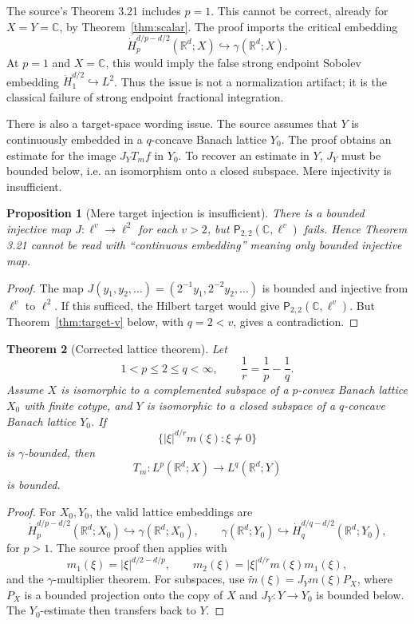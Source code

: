 \documentclass[11pt]{article}
\newtheorem{theorem}{Theorem}[section]
\newtheorem{proposition}[theorem]{Proposition}
\newcommand{\R}{\mathbb R}
\newcommand{\C}{\mathbb C}
\newcommand{\Pprop}{\mathsf P}
\newcommand{\gam}{\gamma}
\newcommand{\abs}[1]{\lvert #1\rvert}
\newcommand{\dotH}{\dot H}
\begin{document}
The source's Theorem 3.21 includes \(p=1\).  This cannot be correct, already
for \(X=Y=\C\), by Theorem~\ref{thm:scalar}.  The proof imports the critical
embedding
\[
  \dot H^{d/p-d/2}_p(\R^d;X)\hookrightarrow \gam(\R^d;X).
\]
At \(p=1\) and \(X=\C\), this would imply the false strong endpoint Sobolev
embedding \(\dot H^{d/2}_1\hookrightarrow L^2\).  Thus the issue is not a
normalization artifact; it is the classical failure of strong endpoint
fractional integration.

There is also a target-space wording issue.  The source assumes that \(Y\) is
continuously embedded in a \(q\)-concave Banach lattice \(Y_0\).  The proof
obtains an estimate for the image \(J_YT_mf\) in \(Y_0\).  To recover an
estimate in \(Y\), \(J_Y\) must be bounded below, i.e. an isomorphism onto a
closed subspace.  Mere injectivity is insufficient.

\begin{proposition}[Mere target injection is insufficient]\label{prop:injection}
There is a bounded injective map \(J:\ell^v\to\ell^2\) for each \(v>2\), but
\(\Pprop_{2,2}(\C,\ell^v)\) fails.  Hence Theorem 3.21 cannot be read with
``continuous embedding'' meaning only bounded injective map.
\end{proposition}

\begin{proof}
The map \(J(y_1,y_2,\ldots)=(2^{-1}y_1,2^{-2}y_2,\ldots)\) is bounded and
injective from \(\ell^v\) to \(\ell^2\).  If this sufficed, the Hilbert target
would give \(\Pprop_{2,2}(\C,\ell^v)\).  But Theorem~\ref{thm:target-v} below,
with \(q=2<v\), gives a contradiction.
\end{proof}

\begin{theorem}[Corrected lattice theorem]\label{thm:corrected321}
Let
\[
  1<p\le2\le q<\infty,\qquad \frac1r=\frac1p-\frac1q.
\]
Assume \(X\) is isomorphic to a complemented subspace of a \(p\)-convex Banach
lattice \(X_0\) with finite cotype, and \(Y\) is isomorphic to a closed subspace
of a \(q\)-concave Banach lattice \(Y_0\).  If
\[
  \{\abs{\xi}^{d/r}m(\xi):\xi\ne0\}
\]
is \(\gam\)-bounded, then
\[
  T_m:L^p(\R^d;X)\to L^q(\R^d;Y)
\]
is bounded.
\end{theorem}

\begin{proof}
For \(X_0,Y_0\), the valid lattice embeddings are
\[
 \dotH^{d/p-d/2}_p(\R^d;X_0)\hookrightarrow\gam(\R^d;X_0),
 \qquad
 \gam(\R^d;Y_0)\hookrightarrow\dotH^{d/q-d/2}_q(\R^d;Y_0),
\]
for \(p>1\).  The source proof then applies with
\[
  m_1(\xi)=\abs{\xi}^{d/2-d/p},\qquad
  m_2(\xi)=\abs{\xi}^{d/r}m(\xi)m_1(\xi),
\]
and the \(\gam\)-multiplier theorem.  For subspaces, use
\(\widetilde m(\xi)=J_Ym(\xi)P_X\), where \(P_X\) is a bounded projection onto
the copy of \(X\) and \(J_Y:Y\to Y_0\) is bounded below.  The \(Y_0\)-estimate
then transfers back to \(Y\).
\end{proof}
\end{document}
